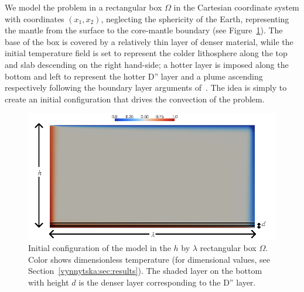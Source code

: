 We model the problem in a rectangular box $\Omega$ in the Cartesian
coordinate system with coordinates $(x_1, x_2)$, neglecting the
sphericity of the Earth, representing the mantle from the surface to
the core-mantle boundary (see Figure~\ref{vynnytska:fig:IC}). The base
of the box is covered by a relatively thin layer of denser material,
while the initial temperature field is set to represent the colder
lithosphere along the top and slab descending on the right hand-side;
a hotter layer is imposed along the bottom and left to represent the
hotter D'' layer and a plume ascending respectively following the
boundary layer arguments of~\citet{KekenEtAl1997}. The idea is simply
to create an initial configuration that drives the convection of the
problem.
\begin{figure}
   \center\includegraphics[width=0.95\columnwidth]{chapters/vynnytska/png/layout.png}
    \caption{Initial configuration of the model in the $h$ by
      $\lambda$ rectangular box $\Omega$. Color shows dimensionless
      temperature (for dimensional values, see
      Section~\ref{vynnytska:sec:results}). The shaded layer on the
      bottom with height $d$ is the denser layer corresponding to the
      D'' layer.}
  \label{vynnytska:fig:IC}
\end{figure}

